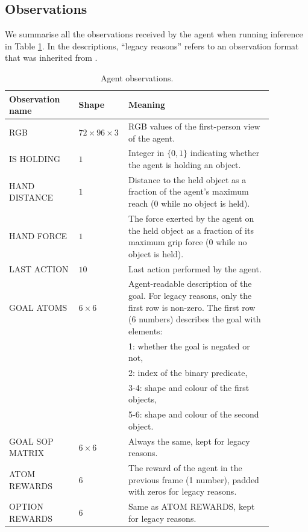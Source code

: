 \documentclass[11pt, a4paper, logo, copyright]{deepmind}
\begin{document}
\begin{appendix}
\subsection{Observations}
\label{app:observations}
We summarise all the observations received by the agent when running inference in Table \ref{tab:observations}. In the descriptions, ``legacy reasons'' refers to an observation format that was inherited from \citet{xland}.
\begin{longtable}{>{\raggedright}p{0.25\linewidth}|p{0.1\linewidth}|p{0.52\linewidth}}
    \caption{Agent observations.}
    \label{tab:observations}
    \\ \hline
      \textbf{Observation name} & \textbf{Shape} & \textbf{Meaning} \\
      \hline
      RGB & $72 \times 96 \times 3$ & RGB values of the first-person view of the agent. \\
      \hline
      IS HOLDING & $1$& Integer in $\{0, 1\}$ indicating whether the agent is holding an object.\\
      \hline
      HAND DISTANCE & $1$& Distance to the held object as a fraction of the agent's maximum reach (0 while no object is held).\\
      \hline
      HAND FORCE & $1$ & The force exerted by the agent on the held object as a fraction of its maximum grip force (0 while no object is held).\\
      \hline
      LAST ACTION & $10$ & Last action performed by the agent.\\
      \hline
      GOAL ATOMS & $6 \times 6$ & Agent-readable description of the goal. For legacy reasons, only the first row is non-zero. The first row (6 numbers) describes the goal with elements:\\&&1: whether the goal is negated or not,\\&& 2: index of the binary predicate,\\&&3-4: shape and colour of the first objects,\\&&5-6: shape and colour of the second object. \\
      \hline
      GOAL SOP MATRIX & $6 \times 6$ & Always the same, kept for legacy reasons.\\
      \hline
      ATOM REWARDS & $6$ & The reward of the agent in the previous frame (1 number), padded with zeros for legacy reasons.\\
      \hline
      OPTION REWARDS & $6$ & Same as ATOM REWARDS, kept for legacy reasons.\\

\end{longtable}
\end{appendix}
\end{document}
